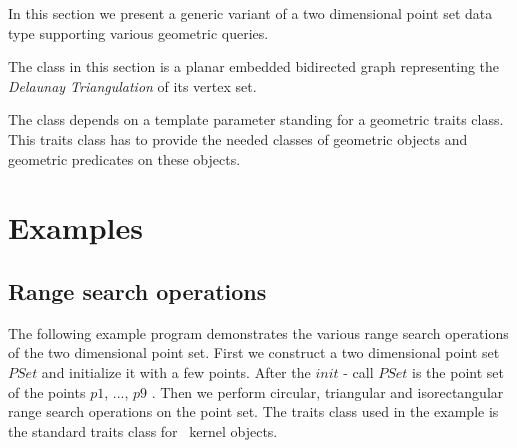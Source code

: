 In this section we present a generic variant of a two dimensional point set
data type supporting various geometric queries.

The  class in this section is a planar embedded bidirected
graph representing the {\em Delaunay Triangulation} of its vertex set.

The  class depends on a template parameter standing for a
geometric traits class. This traits class has to provide the needed classes of
geometric objects and geometric predicates on these objects.

\section{Examples}

\subsection{Range search operations}

The following example program demonstrates the various range search operations
of the two dimensional point set.
First we construct a two dimensional point set $PSet$ and initialize it with a few points.
After the $init$ - call $PSet$ is the point set of the points $p1$, ..., $p9$ .
Then we perform circular, triangular and isorectangular range search operations on the
point set.
The traits class used in the example is the standard traits class for \cgal\ kernel
objects.

\ccHtmlLinksOff

